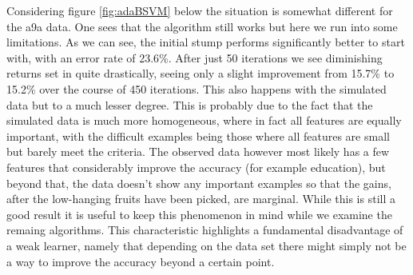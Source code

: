 \newpage
\par Considering figure \ref{fig:adaBSVM} below the situation is somewhat different for the a9a data. One sees that the algorithm still works but here we run into some limitations. As we can see, the initial stump performs significantly better to start with, with an error rate of 23.6\%. After just 50 iterations we see diminishing returns set in quite drastically, seeing only a slight improvement from 15.7\% to 15.2\% over the course of 450 iterations. This also happens with the simulated data but to a much lesser degree. This is probably due to the fact that the simulated data is much more homogeneous, where in fact all features are equally important, with the difficult examples being those where all features are small but barely meet the criteria. The observed data however most likely has a few features that considerably improve the accuracy (for example education), but beyond that, the data doesn't show any important examples so that the gains, after the low-hanging fruits have been picked, are marginal. While this is still a good result it is useful to keep this phenomenon in mind while we examine the remaing algorithms. This characteristic highlights a fundamental disadvantage of a weak learner, namely that depending on the data set there might simply not be a way to improve the accuracy beyond a certain point. 

